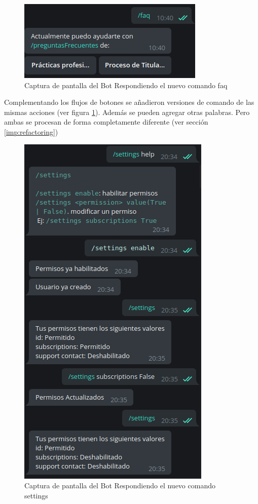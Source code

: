    \begin{figure}[h!]
        \centering
        \includegraphics[scale=0.5]{media/imagenes/sc/faq.png}
        \caption[Bot FAQ]{Captura de pantalla del Bot Respondiendo el nuevo comando faq}
        \label{fig:faq}
    \end{figure}

    \par Complementando los flujos de botones se añadieron versiones de comando de las mismas acciones (ver figura \ref{fig:faq}). Además se pueden agregar otras palabras. Pero ambas se procesan de forma completamente diferente (ver sección \ref{imp:refactoring})

    \begin{figure}[h!]
        \centering
        \includegraphics[scale=0.5]{media/imagenes/sc/settings.png}
        \caption[Bot settings]{Captura de pantalla del Bot Respondiendo el nuevo comando settings}
        \label{fig:bot-settings}
    \end{figure}

